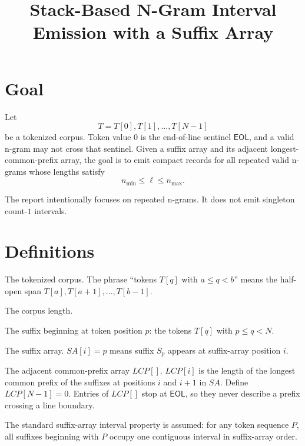 \documentclass[11pt]{article}
\title{Stack-Based N-Gram Interval Emission with a Suffix Array}
\author{}
\date{}
\begin{document}
\maketitle

\section{Goal}

Let
\[
T = T[0], T[1], \ldots, T[N-1]
\]
be a tokenized corpus.  Token value \(0\) is the end-of-line sentinel
\(\mathsf{EOL}\), and a valid n-gram may not cross that sentinel.  Given a
suffix array and its adjacent longest-common-prefix array, the goal is to emit
compact records for all repeated valid n-grams whose lengths satisfy
\[
n_{\min}\leq \ell\leq n_{\max}.
\]

The report intentionally focuses on repeated n-grams.  It does not emit
singleton count-\(1\) intervals.

\section{Definitions}

\begin{description}[leftmargin=2.6cm,style=nextline]
    \item[\(T\)]
    The tokenized corpus.  The phrase ``tokens \(T[q]\) with \(a\leq q<b\)''
    means the half-open span \(T[a],T[a+1],\ldots,T[b-1]\).

    \item[\(N\)]
    The corpus length.

    \item[\(S_p\)]
    The suffix beginning at token position \(p\): the tokens \(T[q]\) with
    \(p\leq q<N\).

    \item[\(\mathit{SA}\)]
    The suffix array.  \(\mathit{SA}[i]=p\) means suffix \(S_p\) appears at
    suffix-array position \(i\).

    \item[\(\mathit{LCP}\)]
    The adjacent common-prefix array \(\mathit{LCP}[]\).  \(\mathit{LCP}[i]\) is the length of the
    longest common prefix of the suffixes at positions \(i\) and \(i+1\) in
    \(\mathit{SA}\).  Define \(\mathit{LCP}[N-1]=0\).  Entries of
    \(\mathit{LCP}[]\) stop at \(\mathsf{EOL}\), so they never describe a prefix
    crossing a line boundary.

    \item[Suffix-array interval]
    The standard suffix-array interval property is assumed: for any token
    sequence \(P\), all suffixes beginning with \(P\) occupy one contiguous
    interval in suffix-array order.
\end{description}
\end{document}
